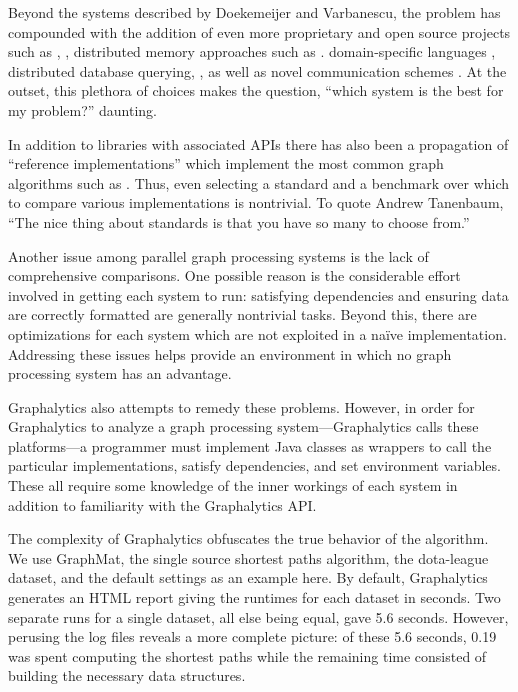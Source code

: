 \documentclass{llncs}
\begin{document}
Beyond the systems described by Doekemeijer and Varbanescu, the problem has compounded with the addition of even more proprietary and open source projects such as \cite{Cheramangalath:2015:Falcon}, \cite{Perez:2015:Ringo}, distributed memory approaches such as \cite{Hong:2015:PGX}. domain-specific languages \cite{Hong:2012:GreenMarl}, distributed database querying, \cite{Rodriguez:2015:Gremlin}, as well as novel communication schemes \cite{Edmonds:2013:ActiveMessages}. At the outset, this plethora of choices makes the question, ``which system is the best for my problem?'' daunting.

In addition to libraries with associated APIs there has also been a propagation of ``reference implementations'' which implement the most common graph algorithms such as \cite{Beamer:2015:GAPBench, Nai:2015:Graphbig}. Thus, even selecting a standard and a benchmark over which to compare various implementations is nontrivial. To quote Andrew Tanenbaum, ``The nice thing about standards is that you have so many to choose from.''

Another issue among parallel graph processing systems is the lack of comprehensive comparisons. One possible reason is the considerable effort involved in getting each system to run: satisfying dependencies and ensuring data are correctly formatted are generally nontrivial tasks. Beyond this, there are optimizations for each system which are not exploited in a na\"ive implementation. Addressing these issues helps provide an environment in which no graph processing system has an advantage.

Graphalytics \cite{Capota:2015:Graphalytics} also attempts to remedy these problems. However, in order for Graphalytics to analyze a graph processing system---Graphalytics calls these platforms---a programmer must implement Java classes as wrappers to call the particular implementations, satisfy dependencies, and set environment variables. These all require some knowledge of the inner workings of each system in addition to familiarity with the Graphalytics API.

The complexity of Graphalytics obfuscates the true behavior of the algorithm. We use GraphMat, the single source shortest paths algorithm, the dota-league dataset, and the default settings as an example here. By default, Graphalytics generates an HTML report giving the runtimes for each dataset in seconds. Two separate runs for a single dataset, all else being equal, gave 5.6 seconds. However, perusing the log files reveals a more complete picture: of these 5.6 seconds, 0.19 was spent computing the shortest paths while the remaining time consisted of building the necessary data structures.
\end{document}
